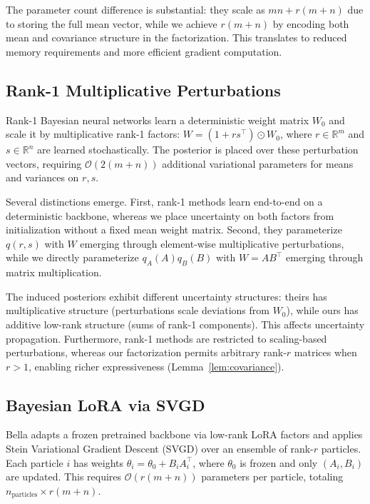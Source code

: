 \documentclass{article}
\theoremstyle{plain}
\theoremstyle{definition}
\theoremstyle{remark}
\begin{document}
The parameter count difference is substantial: they scale as $mn + r(m+n)$ due to storing the full mean vector, while we achieve $r(m+n)$ by encoding both mean and covariance structure in the factorization. This translates to reduced memory requirements and more efficient gradient computation.

\subsection{Rank-1 Multiplicative Perturbations \cite{dusenberry2020efficient}}

Rank-1 Bayesian neural networks learn a deterministic weight matrix $W_0$ and scale it by multiplicative rank-1 factors: $W = (1 + rs^\top) \odot W_0$, where $r \in \mathbb{R}^m$ and $s \in \mathbb{R}^n$ are learned stochastically. The posterior is placed over these perturbation vectors, requiring $\mathcal{O}(2(m+n))$ additional variational parameters for means and variances on $r, s$.

Several distinctions emerge. First, rank-1 methods learn end-to-end on a deterministic backbone, whereas we place uncertainty on both factors from initialization without a fixed mean weight matrix. Second, they parameterize $q(r, s)$ with $W$ emerging through element-wise multiplicative perturbations, while we directly parameterize $q_A(A) q_B(B)$ with $W = AB^\top$ emerging through matrix multiplication.

The induced posteriors exhibit different uncertainty structures: theirs has multiplicative structure (perturbations scale deviations from $W_0$), while ours has additive low-rank structure (sums of rank-1 components). This affects uncertainty propagation. Furthermore, rank-1 methods are restricted to scaling-based perturbations, whereas our factorization permits arbitrary rank-$r$ matrices when $r > 1$, enabling richer expressiveness (Lemma~\ref{lem:covariance}).

\subsection{Bayesian LoRA via SVGD \cite{doan2025bayesian}}

Bella adapts a frozen pretrained backbone via low-rank LoRA factors and applies Stein Variational Gradient Descent (SVGD) over an ensemble of rank-$r$ particles. Each particle $i$ has weights $\theta_i = \theta_0 + B_i A_i^\top$, where $\theta_0$ is frozen and only $(A_i, B_i)$ are updated. This requires $\mathcal{O}(r(m+n))$ parameters per particle, totaling $n_{\text{particles}} \times r(m+n)$.
\end{document}
